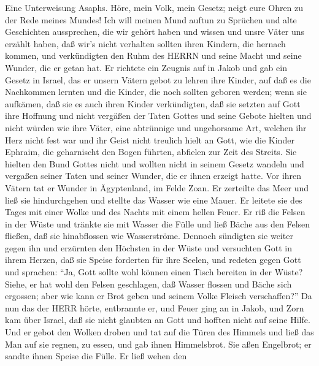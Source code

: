  Eine Unterweisung Asaphs. Höre, mein Volk, mein Gesetz;
neigt eure Ohren zu der Rede meines Mundes!  Ich will meinen
Mund auftun zu Sprüchen und alte Geschichten aussprechen, 
die wir gehört haben und wissen und unsre Väter uns erzählt haben,
 daß wir's nicht verhalten sollten ihren Kindern, die
hernach kommen, und verkündigten den Ruhm des HERRN und seine Macht und
seine Wunder, die er getan hat.  Er richtete ein Zeugnis auf
in Jakob und gab ein Gesetz in Israel, das er unsern Vätern gebot zu
lehren ihre Kinder,  auf daß es die Nachkommen lernten und
die Kinder, die noch sollten geboren werden; wenn sie aufkämen, daß sie
es auch ihren Kinder verkündigten,  daß sie setzten auf Gott
ihre Hoffnung und nicht vergäßen der Taten Gottes und seine Gebote
hielten  und nicht würden wie ihre Väter, eine abtrünnige
und ungehorsame Art, welchen ihr Herz nicht fest war und ihr Geist nicht
treulich hielt an Gott,  wie die Kinder Ephraim, die
geharnischt den Bogen führten, abfielen zur Zeit des Streits.
 Sie hielten den Bund Gottes nicht und wollten nicht in
seinem Gesetz wandeln  und vergaßen seiner Taten und seiner
Wunder, die er ihnen erzeigt hatte.  Vor ihren Vätern tat
er Wunder in Ägyptenland, im Felde Zoan.  Er zerteilte das
Meer und ließ sie hindurchgehen und stellte das Wasser wie eine Mauer.
 Er leitete sie des Tages mit einer Wolke und des Nachts
mit einem hellen Feuer.  Er riß die Felsen in der Wüste und
tränkte sie mit Wasser die Fülle  und ließ Bäche aus den
Felsen fließen, daß sie hinabflossen wie Wasserströme. 
Dennoch sündigten sie weiter gegen ihn und erzürnten den Höchsten in der
Wüste  und versuchten Gott in ihrem Herzen, daß sie Speise
forderten für ihre Seelen,  und redeten gegen Gott und
sprachen: ``Ja, Gott sollte wohl können einen Tisch bereiten in der
Wüste?  Siehe, er hat wohl den Felsen geschlagen, daß
Wasser flossen und Bäche sich ergossen; aber wie kann er Brot geben und
seinem Volke Fleisch verschaffen?''  Da nun das der HERR
hörte, entbrannte er, und Feuer ging an in Jakob, und Zorn kam über
Israel,  daß sie nicht glaubten an Gott und hofften nicht
auf seine Hilfe.  Und er gebot den Wolken droben und tat
auf die Türen des Himmels  und ließ das Man auf sie regnen,
zu essen, und gab ihnen Himmelsbrot.  Sie aßen Engelbrot;
er sandte ihnen Speise die Fülle.  Er ließ wehen den

